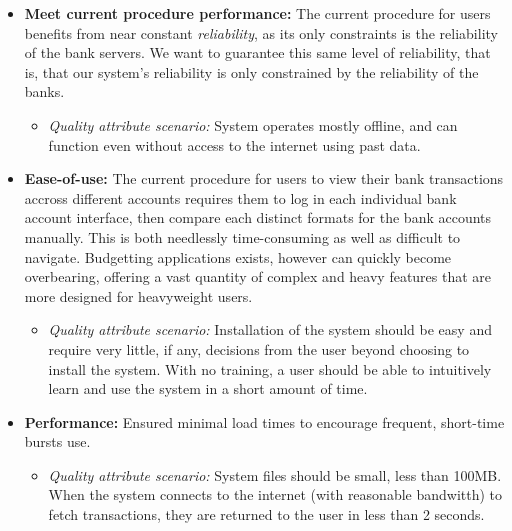 \documentclass[11pt]{article}
\newcounter{use case ID}
\begin{document}

\begin{itemize}
    \item \textbf{Meet current procedure performance:} The current procedure for users benefits from near constant \textit{reliability}, as its only constraints is the reliability of the bank servers. We want to guarantee this same level of reliability, that is, that our system's reliability is only constrained by the reliability of the banks. %
    \begin{itemize}
        \item \textit{Quality attribute scenario:} System operates mostly offline, and can function even without access to the internet using past data.
    \end{itemize}
    \item \textbf{Ease-of-use:} The current procedure for users to view their bank transactions accross different accounts requires them to log in each individual bank account interface, then compare each distinct formats for the bank accounts manually. This is both needlessly time-consuming as well as difficult to navigate. Budgetting applications exists, however can quickly become overbearing, offering a vast quantity of complex and heavy features that are more designed for heavyweight users.
        \begin{itemize}
            \item \textit{Quality attribute scenario:} Installation of the system should be easy and require very little, if any, decisions from the user beyond choosing to install the system. With no training, a user should be able to intuitively learn and use the system in a short amount of time.
        \end{itemize}
    \item \textbf{Performance:} Ensured minimal load times to encourage frequent, short-time bursts use.
        \begin{itemize}
            \item \textit{Quality attribute scenario:} System files should be small, less than 100MB. When the system connects to the internet (with reasonable bandwitth) to fetch transactions, they are returned to the user in less than 2 seconds.

\end{itemize}
\end{itemize}
\end{document}
